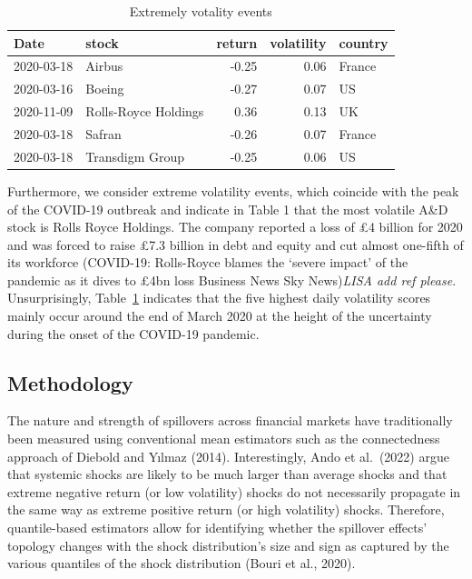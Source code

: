 \documentclass[
  letterpaper,
  DIV=11,
  numbers=noendperiod]{scrartcl}
\begin{document}
\hypertarget{tbl-Xtremes}{}
\begin{table}[H]
\caption{\label{tbl-Xtremes}Extremely votality events }\tabularnewline

\centering
\begin{tabular}[t]{llrrl}
\toprule
Date & stock & return & volatility & country\\
\midrule
2020-03-18 & Airbus & -0.25 & 0.06 & France\\
2020-03-16 & Boeing & -0.27 & 0.07 & US\\
2020-11-09 & Rolls-Royce Holdings & 0.36 & 0.13 & UK\\
2020-03-18 & Safran & -0.26 & 0.07 & France\\
2020-03-18 & Transdigm Group & -0.25 & 0.06 & US\\
\bottomrule
\end{tabular}
\end{table}

Furthermore, we consider extreme volatility events, which coincide with
the peak of the COVID-19 outbreak and indicate in Table 1 that the most
volatile A\&D stock is Rolls Royce Holdings. The company reported a loss
of £4 billion for 2020 and was forced to raise £7.3 billion in debt and
equity and cut almost one-fifth of its workforce (COVID-19: Rolls-Royce
blames the `severe impact' of the pandemic as it dives to £4bn loss
\textbar{} Business News \textbar{} Sky News)\emph{LISA add ref please}.
Unsurprisingly, Table~\ref{tbl-Xtremes} indicates that the five highest
daily volatility scores mainly occur around the end of March 2020 at the
height of the uncertainty during the onset of the COVID-19 pandemic.

\hypertarget{methodology}{%
\subsection{Methodology}\label{methodology}}

The nature and strength of spillovers across financial markets have
traditionally been measured using conventional mean estimators such as
the connectedness approach of Diebold and Yılmaz (2014). Interestingly,
Ando et al.~(2022) argue that systemic shocks are likely to be much
larger than average shocks and that extreme negative return (or low
volatility) shocks do not necessarily propagate in the same way as
extreme positive return (or high volatility) shocks. Therefore,
quantile-based estimators allow for identifying whether the spillover
effects' topology changes with the shock distribution's size and sign as
captured by the various quantiles of the shock distribution (Bouri et
al., 2020).
\end{document}
